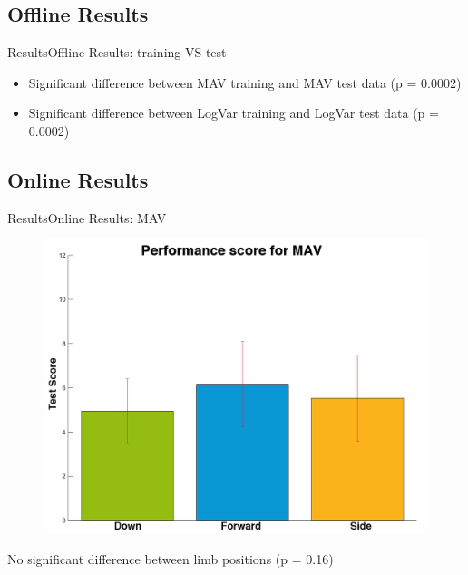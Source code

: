 \documentclass[10pt]{beamer}
\begin{document}
\subsection{Offline Results}
\begin{frame}{Results}{Offline Results: training VS test}
\begin{itemize}
	\item Significant difference between MAV training and MAV test data (p = 0.0002)
	\item Significant difference between LogVar training and LogVar test data (p = 0.0002)
\end{itemize}
\end{frame}


\subsection{Online Results}
\begin{frame}{Results}{Online Results: MAV}
\begin{figure}
	\includegraphics[scale=0.27]{figures/gotItMAV.png}
\end{figure}
No significant difference between limb positions (p = 0.16)
\end{frame}
\end{document}
